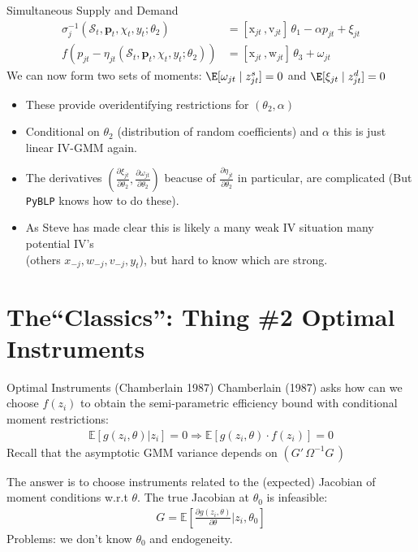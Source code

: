 \begin{frame}{Simultaneous Supply and Demand}
\begin{align*}
\sigma_j^{-1}(\mathcal{S}_t,\mathbf{p}_t,\chi_t, y_t; \theta_2) &= [\mathrm{x}_{jt} \,,  \mathrm{v}_{jt}]\, \theta_1 - \alpha p_{jt} + \xi_{jt}\\
f\left(p_{jt}- \eta_{jt}(\mathcal{S}_t,\mathbf{p}_t,\chi_t, y_t ;\theta_2)  \right) &= [\mathrm{x}_{jt} \,, \mathrm{w}_{jt}]\, \theta_3 +  \omega_{jt}
\end{align*}
We can now form two sets of moments: $\E[\omega_{jt} \mid  z_{jt}^{s}]=0$ and $\E[\xi_{jt} \mid  z_{jt}^{d}]=0$
\begin{itemize}
    \item These provide \alert{overidentifying restrictions} for $(\theta_2, \alpha)$
     \item Conditional on $\theta_2$ (distribution of random coefficients) and $\alpha$ this is just linear IV-GMM again.
     \item The derivatives $\left(\frac{\partial \xi_{jt}}{\partial \theta_2}, \frac{\partial \omega_{jt}}{\partial \theta_2} \right)$ beacuse of $\frac{\partial \eta_{jt}}{\partial \theta_2}$ in particular, are complicated (But \texttt{PyBLP} knows how to do these).
     \item As Steve has made clear this is likely a \alert{many weak IV} situation many potential IV's\\
      (others $x_{-j},w_{-j},v_{-j},y_t$), but hard to know which are strong.
\end{itemize}
\end{frame}


\section*{The``Classics'': Thing \#2 Optimal Instruments}

\begin{frame}{Optimal Instruments (Chamberlain 1987)}
Chamberlain (1987) asks how can we choose $f(z_i)$ to obtain the semi-parametric efficiency bound with conditional moment restrictions:
\begin{align*}
\mathbb{E}[g(z_i,\theta) | z_i]=0 \Rightarrow \mathbb{E}[g(z_i,\theta) \cdot f(z_i) ]=0 
\end{align*}
Recall that the asymptotic GMM variance depends on $(G'\, \Omega^{-1} G\,)$

The answer is to choose instruments related to the (expected) Jacobian of moment conditions w.r.t $\theta$. The true Jacobian at $\theta_0$ is \alert{infeasible}:
\begin{align*}
G=\mathbb{E}\left[\frac{\partial g(z_i,\theta)}{\partial \theta} | z_i, \theta_0 \right]
\end{align*}
Problems: we don't know $\theta_0$ and endogeneity.
\end{frame}


